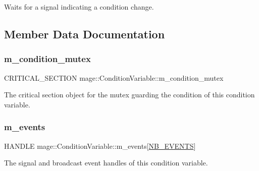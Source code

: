Waits for a signal indicating a condition change. 

\subsection{Member Data Documentation}
\hypertarget{structmage_1_1_condition_variable_ab5ff870b2881a1979ccaec986d762441}{}\label{structmage_1_1_condition_variable_ab5ff870b2881a1979ccaec986d762441} 
\subsubsection{\texorpdfstring{m\+\_\+condition\+\_\+mutex}{m\_condition\_mutex}}
{\footnotesize\ttfamily C\+R\+I\+T\+I\+C\+A\+L\+\_\+\+S\+E\+C\+T\+I\+ON mage\+::\+Condition\+Variable\+::m\+\_\+condition\+\_\+mutex\hspace{0.3cm}{\ttfamily [private]}}

The critical section object for the mutex guarding the condition of this condition variable. \hypertarget{structmage_1_1_condition_variable_ac61c3440af244ec43d2ad53026ec9de4}{}\label{structmage_1_1_condition_variable_ac61c3440af244ec43d2ad53026ec9de4} 
\subsubsection{\texorpdfstring{m\+\_\+events}{m\_events}}
{\footnotesize\ttfamily H\+A\+N\+D\+LE mage\+::\+Condition\+Variable\+::m\+\_\+events\mbox{[}\hyperlink{structmage_1_1_condition_variable_a18acb6d59c39a7bf9ee86939f4635000abc7182486d437f413ac9c77ae0bfdac1}{N\+B\+\_\+\+E\+V\+E\+N\+TS}\mbox{]}\hspace{0.3cm}{\ttfamily [private]}}

The signal and broadcast event handles of this condition variable. \hypertarget{structmage_1_1_condition_variable_ac02cb14000a597ec91b8546bdcbb9dd1}{}\label{structmage_1_1_condition_variable_ac02cb14000a597ec91b8546bdcbb9dd1} 
